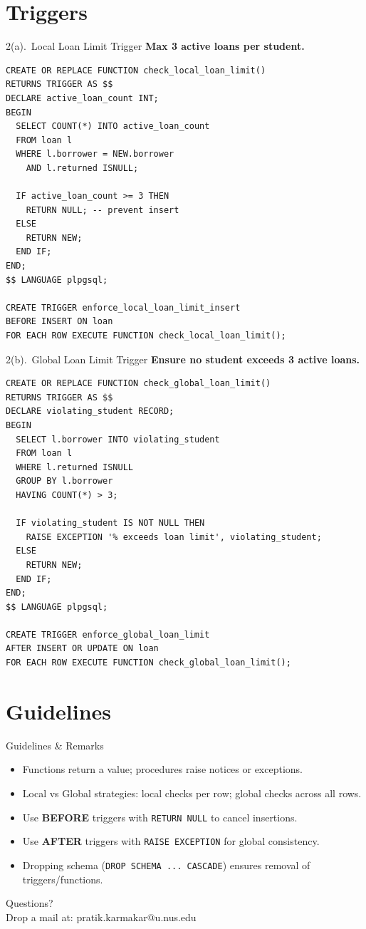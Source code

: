 \documentclass{beamer}
\begin{document}
\section{Triggers}
\begin{frame}[fragile]{2(a).\ Local Loan Limit Trigger}
\textbf{Max 3 active loans per student.}
\begin{lstlisting}
CREATE OR REPLACE FUNCTION check_local_loan_limit()
RETURNS TRIGGER AS $$
DECLARE active_loan_count INT;
BEGIN
  SELECT COUNT(*) INTO active_loan_count
  FROM loan l
  WHERE l.borrower = NEW.borrower
    AND l.returned ISNULL;

  IF active_loan_count >= 3 THEN
    RETURN NULL; -- prevent insert
  ELSE
    RETURN NEW;
  END IF;
END;
$$ LANGUAGE plpgsql;

CREATE TRIGGER enforce_local_loan_limit_insert
BEFORE INSERT ON loan
FOR EACH ROW EXECUTE FUNCTION check_local_loan_limit();
\end{lstlisting}
\end{frame}

\begin{frame}[fragile]{2(b).\ Global Loan Limit Trigger}
\textbf{Ensure no student exceeds 3 active loans.}
\begin{lstlisting}
CREATE OR REPLACE FUNCTION check_global_loan_limit()
RETURNS TRIGGER AS $$
DECLARE violating_student RECORD;
BEGIN
  SELECT l.borrower INTO violating_student
  FROM loan l
  WHERE l.returned ISNULL
  GROUP BY l.borrower
  HAVING COUNT(*) > 3;

  IF violating_student IS NOT NULL THEN
    RAISE EXCEPTION '% exceeds loan limit', violating_student;
  ELSE
    RETURN NEW;
  END IF;
END;
$$ LANGUAGE plpgsql;

CREATE TRIGGER enforce_global_loan_limit
AFTER INSERT OR UPDATE ON loan
FOR EACH ROW EXECUTE FUNCTION check_global_loan_limit();
\end{lstlisting}
\end{frame}

\section{Guidelines}
\begin{frame}{Guidelines \& Remarks}
\small
\begin{itemize}\itemsep4pt
  \item Functions return a value; procedures raise notices or exceptions.
  \item Local vs Global strategies: local checks per row; global checks across all rows.
  \item Use \textbf{BEFORE} triggers with \texttt{RETURN NULL} to cancel insertions.
  \item Use \textbf{AFTER} triggers with \texttt{RAISE EXCEPTION} for global consistency.
  \item Dropping schema (\texttt{DROP SCHEMA ... CASCADE}) ensures removal of triggers/functions.
\end{itemize}
\end{frame}

\begin{frame}
\begin{center}
Questions?\\
Drop a mail at: pratik.karmakar@u.nus.edu
\end{center}
\end{frame}
\end{document}
